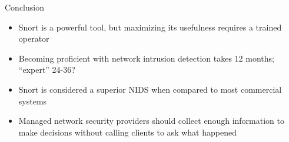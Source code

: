 \begin{frame}[t]{Conclusion}
  \fontsize{17}{20.5}\selectfont
  \vspace{0.15cm}
  \begin{itemize}
    \item Snort is a \textcolor{CommandGreen}{powerful tool}, but maximizing its usefulness requires a trained operator
    \item Becoming proficient with network intrusion detection takes 12 months; ``expert'' 24-36?
    \item Snort is considered \textcolor{CommandGreen}{a superior NIDS} when compared to most commercial systems
    \item \textcolor{CommandGreen}{Managed network security} providers should collect enough information to make decisions without calling clients to ask what happened
  \end{itemize}
\end{frame}

